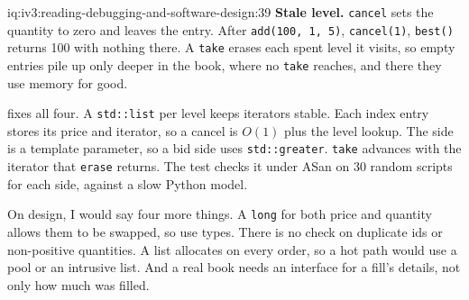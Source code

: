 \begin{solution}{iq:iv3:reading-debugging-and-software-design:39}
\textbf{Stale level.} \texttt{cancel} sets the quantity to zero and leaves the entry. After \texttt{add(100, 1, 5)}, \texttt{cancel(1)}, \texttt{best()} returns 100 with nothing there. A \texttt{take} erases each spent level it visits, so empty entries pile up only deeper in the book, where no \texttt{take} reaches, and there they use memory for good.

 fixes all four. A \texttt{std::list} per level keeps iterators stable. Each index entry stores its price and iterator, so a cancel is $O(1)$ plus the level lookup. The side is a template parameter, so a bid side uses \texttt{std::greater}. \texttt{take} advances with the iterator that \texttt{erase} returns. The test checks it under ASan on 30 random scripts for each side, against a slow Python model.

\enlargethispage{-3\baselineskip}%
\label{lst:iv3:rd:bookfixed}

On design, I would say four more things. A \texttt{long} for both price and quantity allows them to be swapped, so use types. There is no check on duplicate ids or non-positive quantities. A list allocates on every order, so a hot path would use a pool or an intrusive list. And a real book needs an interface for a fill's details, not only how much was filled.


\end{solution}

